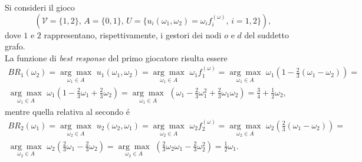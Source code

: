 \documentclass[11pt,largemargins]{homework}
\begin{document}
\begin{alphaparts}
    \questionpart
    Si consideri il gioco
    \begin{equation*}
    \left(\mathcal{V}=\{1,2\}, \, A=\{0,1\},\, U=\{u_{i}\left(\omega_{1},\omega_{2}\right)=\omega_{i}f_{i}^{(\omega)}, \, i=1,2\}\right),
    \end{equation*}
    dove $1$ e $2$ rappresentano, rispettivamente, i gestori dei nodi $o$ e $d$ del suddetto grafo.\\
    La funzione di \emph{best response} del primo giocatore risulta essere
    \begin{align*}
    BR_{1}\left(\omega_{2}\right)=\underset{\omega_{1}\in A}{\arg\max} \, \, u_{1}\left(\omega_{1},\omega_{2}\right)= \underset{\omega_{1}\in A}{\arg\max} \, \, \omega_{1}f_{1}^{(\omega)}= \underset{\omega_{1}\in A}{\arg\max} \, \, \omega_{1}\left(1-\frac{2}{3}\left(\omega_{1}-\omega_{2}\right)\right)=\\
 \underset{\omega_{1}\in A}{\arg\max} \, \, \omega_{1}\left(1-\frac{2}{3}\omega_{1}+\frac{2}{3}\omega_{2}\right)=\underset{\omega_{1}\in A}{\arg\max} \, \, \left(\omega_{1}-\frac{2}{3}\omega_{1}^{2}+\frac{2}{3}\omega_{1}\omega_{2}\right)=\frac{3}{4}+\frac{1}{2}\omega_{2},  
    \end{align*}
    mentre quella relativa al secondo é
    \begin{align*}
     BR_{2}\left(\omega_{1}\right)=\underset{\omega_{2}\in A}{\arg\max} \, \, u_{2}\left(\omega_{2},\omega_{1}\right)= \underset{\omega_{2}\in A}{\arg\max} \, \, \omega_{2}f_{2}^{(\omega)}= \underset{\omega_{2}\in A}{\arg\max} \, \, \omega_{2}\left(\frac{2}{3}\left(\omega_{1}-\omega_{2}\right)\right)=\\
 \underset{\omega_{2}\in A}{\arg\max} \, \, \omega_{2}\left(\frac{2}{3}\omega_{1}-\frac{2}{3}\omega_{2}\right)=\underset{\omega_{2}\in A}{\arg\max} \, \, \left(\frac{2}{3}\omega_{2}\omega_{1}-\frac{2}{3}\omega_{2}^{2}\right)=\frac{1}{2}\omega_{1}.
    \end{align*}
    



\end{alphaparts}
\end{document}
